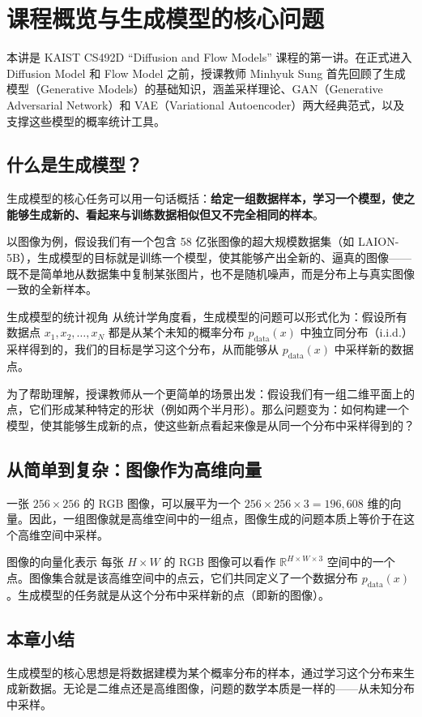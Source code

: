 \section{课程概览与生成模型的核心问题}

本讲是 KAIST CS492D ``Diffusion and Flow Models'' 课程的第一讲。在正式进入 Diffusion Model 和 Flow Model 之前，授课教师 Minhyuk Sung 首先回顾了生成模型（Generative Models）的基础知识，涵盖采样理论、GAN（Generative Adversarial Network）和 VAE（Variational Autoencoder）两大经典范式，以及支撑这些模型的概率统计工具。

\subsection{什么是生成模型？}

生成模型的核心任务可以用一句话概括：\textbf{给定一组数据样本，学习一个模型，使之能够生成新的、看起来与训练数据相似但又不完全相同的样本}。

以图像为例，假设我们有一个包含 58 亿张图像的超大规模数据集（如 LAION-5B），生成模型的目标就是训练一个模型，使其能够产出全新的、逼真的图像——既不是简单地从数据集中复制某张图片，也不是随机噪声，而是分布上与真实图像一致的全新样本。

\begin{importantbox}{生成模型的统计视角}
从统计学角度看，生成模型的问题可以形式化为：假设所有数据点 $x_1, x_2, \ldots, x_N$ 都是从某个未知的概率分布 $p_{\text{data}}(x)$ 中独立同分布（i.i.d.）采样得到的，我们的目标是学习这个分布，从而能够从 $p_{\text{data}}(x)$ 中采样新的数据点。
\end{importantbox}

为了帮助理解，授课教师从一个更简单的场景出发：假设我们有一组二维平面上的点，它们形成某种特定的形状（例如两个半月形）。那么问题变为：如何构建一个模型，使其能够生成新的点，使这些新点看起来像是从同一个分布中采样得到的？

\subsection{从简单到复杂：图像作为高维向量}

一张 $256 \times 256$ 的 RGB 图像，可以展平为一个 $256 \times 256 \times 3 = 196{,}608$ 维的向量。因此，一组图像就是高维空间中的一组点，图像生成的问题本质上等价于在这个高维空间中采样。

\begin{knowledgebox}{图像的向量化表示}
每张 $H \times W$ 的 RGB 图像可以看作 $\mathbb{R}^{H \times W \times 3}$ 空间中的一个点。图像集合就是该高维空间中的点云，它们共同定义了一个数据分布 $p_{\text{data}}(x)$。生成模型的任务就是从这个分布中采样新的点（即新的图像）。
\end{knowledgebox}

\subsection{本章小结}

生成模型的核心思想是将数据建模为某个概率分布的样本，通过学习这个分布来生成新数据。无论是二维点还是高维图像，问题的数学本质是一样的——从未知分布中采样。

\newpage

